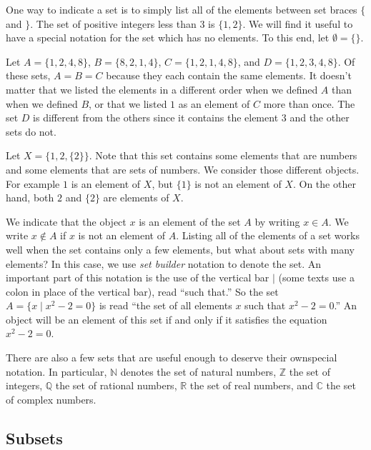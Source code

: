 One way to indicate a set is to simply list all of the elements between set braces $\{$ and $\}$.  The set of positive integers less than 3 is $\{1,2\}$.  We will find it useful to have a special notation for the set which has no elements.  To this end, let $\emptyset=\{ \}$.

\begin{example}
Let $A=\{ 1,2,4,8\}$, $B=\{ 8, 2, 1, 4\}$, $C=\{1,2,1,4,8\}$, and $D=\{1,2,3,4,8\}$.  Of these sets, $A=B=C$ because they each contain the same elements.  It doesn't matter that we listed the elements in a different order when we defined $A$ than when we defined $B$, or that we listed $1$ as an element of $C$ more than once.  The set $D$ is different from the others since it contains the element $3$ and the other sets do not.
\end{example}

\begin{example}
Let $X=\bigl\{1,2,\{2\}\bigr\}$. Note that this set contains some elements that are numbers and some elements that are sets of numbers. We consider those different objects. For example $1$ is an element of $X$, but $\{1\}$ is not an element of $X$. On the other hand, both $2$ and $\{2\}$ are elements of $X$.
\end{example}

We indicate that the object $x$ is an element of the set $A$ by writing $x\in A$.  We write $x\notin A$ if $x$ is not an element of $A$. Listing all of the elements of a set works well when the set contains only a few elements, but what about sets with many elements?  In this case, we use \emph{set builder} notation to denote the set.  An important part of this notation is the use of the vertical bar $\mid$ (some texts use a colon in place of the vertical bar), read ``such that.''  So the set $A=\{ x\mid x^2-2=0\}$ is read ``the set of all elements $x$ such that $x^2-2=0$.''  An object will be an element of this set if and only if it satisfies the equation $x^2-2=0$.

There are also a few sets that are useful enough to deserve their ownspecial notation.  In particular, $\mathbb N$ denotes the set of natural numbers, $\mathbb Z$ the set of integers, $\mathbb Q$ the set of rational numbers, $\mathbb R$ the set of real numbers, and $\mathbb C$ the set of complex numbers.

\subsection{Subsets}

